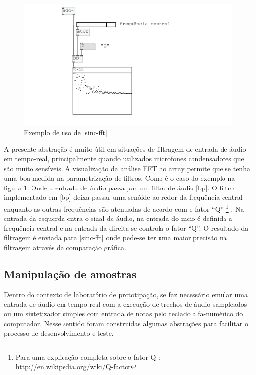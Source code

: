 \documentclass[draft]{ppgmus}
\begin{document}
\begin{figure}
\includegraphics[scale=.55]{sinc-fft-help}
\caption{Exemplo de uso de [sinc-fft]}
\label{sinc-fft-help}
\end{figure}


A presente abstração é muito útil em situações de filtragem de entrada de áudio em tempo-real, principalmente
quando utilizados microfones condensadores que são muito sensíveis.
A visualização da análise FFT no array permite que se tenha uma boa medida na parametrização de filtros.
Como é o caso do exemplo na figura \ref{sinc-fft-help}. Onde a entrada de áudio passa por um filtro
de áudio [bp\texttildelow]. O filtro implementado em [bp\texttildelow] deixa passar uma senóide ao
redor da frequência central enquanto as outras frequências são atenuadas de acordo com o fator ``Q''
\footnote{Para uma explicação completa sobre o fator Q : http://en.wikipedia.org/wiki/Q-factor} .
Na entrada da esquerda entra o sinal de áudio, na entrada do meio é definida a frequência central e na
entrada da direita se controla o fator ``Q''. O resultado da filtragem é enviada para [sinc-fft] onde 
pode-se ter uma maior precisão na filtragem através da comparação gráfica.

 

\subsection{Manipulação de amostras}


  Dentro do  contexto de laboratório de prototipação, se faz necessário emular uma entrada 
de áudio em tempo-real com a execução de trechos de áudio sampleados ou um sintetizador simples
com entrada de notas pelo teclado alfa-numérico do computador. Nesse sentido foram construídas
algumas abstrações para facilitar o processo de desenvolvimento e teste.
\end{document}

